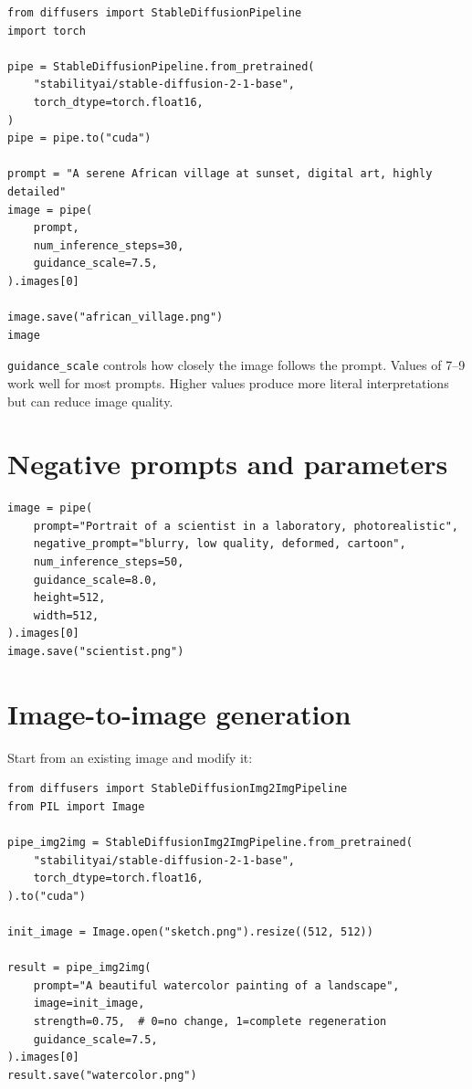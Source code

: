 \begin{verbatim}
from diffusers import StableDiffusionPipeline
import torch

pipe = StableDiffusionPipeline.from_pretrained(
    "stabilityai/stable-diffusion-2-1-base",
    torch_dtype=torch.float16,
)
pipe = pipe.to("cuda")

prompt = "A serene African village at sunset, digital art, highly detailed"
image = pipe(
    prompt,
    num_inference_steps=30,
    guidance_scale=7.5,
).images[0]

image.save("african_village.png")
image
\end{verbatim}

\begin{aitip}
\texttt{guidance\_scale} controls how closely the image follows the prompt. Values of 7--9 work well for most prompts. Higher values produce more literal interpretations but can reduce image quality.
\end{aitip}

\section{Negative prompts and parameters}

\begin{verbatim}
image = pipe(
    prompt="Portrait of a scientist in a laboratory, photorealistic",
    negative_prompt="blurry, low quality, deformed, cartoon",
    num_inference_steps=50,
    guidance_scale=8.0,
    height=512,
    width=512,
).images[0]
image.save("scientist.png")
\end{verbatim}

\section{Image-to-image generation}

Start from an existing image and modify it:

\begin{verbatim}
from diffusers import StableDiffusionImg2ImgPipeline
from PIL import Image

pipe_img2img = StableDiffusionImg2ImgPipeline.from_pretrained(
    "stabilityai/stable-diffusion-2-1-base",
    torch_dtype=torch.float16,
).to("cuda")

init_image = Image.open("sketch.png").resize((512, 512))

result = pipe_img2img(
    prompt="A beautiful watercolor painting of a landscape",
    image=init_image,
    strength=0.75,  # 0=no change, 1=complete regeneration
    guidance_scale=7.5,
).images[0]
result.save("watercolor.png")
\end{verbatim}

